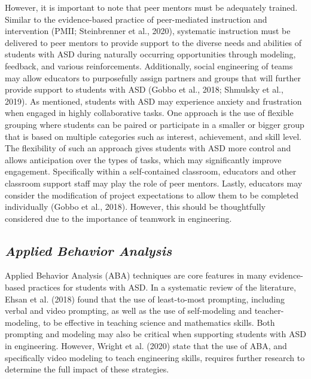 \documentclass[11.5pt]{sig-alternate}
\begin{document}
\begin{large}
However, it is important to note that peer mentors must be adequately trained. Similar to the evidence-based practice of peer-mediated instruction and intervention (PMII; Steinbrenner et al., 2020), systematic instruction must be delivered to peer mentors to provide support to the diverse needs and abilities of students with ASD during naturally occurring opportunities through modeling, feedback, and various reinforcements. Additionally, social engineering of teams may allow educators to purposefully assign partners and groups that will further provide support to students with ASD (Gobbo et al., 2018; Shmulsky et al., 2019). As mentioned, students with ASD may experience anxiety and frustration when engaged in highly collaborative tasks. One approach is the use of flexible grouping where students can be paired or participate in a smaller or bigger group that is based on multiple categories such as interest, achievement, and skill level. The flexibility of such an approach gives students with ASD more control and allows anticipation over the types of tasks, which may significantly improve engagement. Specifically within a self-contained classroom, educators and other classroom support staff may play the role of peer mentors. Lastly, educators may consider the modification of project expectations to allow them to be completed individually (Gobbo et al., 2018). However, this should be thoughtfully considered due to the importance of teamwork in engineering.

\subsection*{\textbf{\textit{Applied Behavior Analysis}}}

Applied Behavior Analysis (ABA) techniques are core features in many evidence-based practices for students with ASD. In a systematic review of the literature, Ehsan et al. (2018) found that the use of least-to-most prompting, including verbal and video prompting, as well as the use of self-modeling and teacher-modeling, to be effective in teaching science and mathematics skills. Both prompting and modeling may also be critical when supporting students with ASD in engineering. However, Wright et al. (2020) state that the use of ABA, and specifically video modeling to teach engineering skills, requires further research to determine the full impact of these strategies. 


\end{large}
\end{document}
